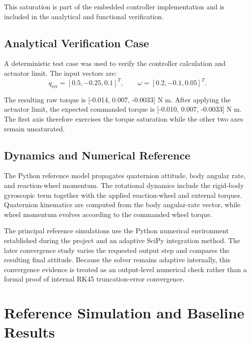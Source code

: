 \documentclass[11pt,a4paper]{article}
\begin{document}
This saturation is part of the embedded controller implementation and is included in the analytical and functional verification.


\subsection{Analytical Verification Case}

A deterministic test case was used to verify the controller calculation and actuator limit. The input vectors are:
\begin{equation}
q_{\mathrm{err}}=[0.5,-0.25,0.1]^T,\qquad \omega=[0.2,-0.1,0.05]^T.
\end{equation}

The resulting raw torque is [-0.014, 0.007, -0.0033] N m. After applying the actuator limit, the expected commanded torque is [-0.010, 0.007, -0.0033] N m. The first axis therefore exercises the torque saturation while the other two axes remain unsaturated.


\subsection{Dynamics and Numerical Reference}

The Python reference model propagates quaternion attitude, body angular rate, and reaction-wheel momentum. The rotational dynamics include the rigid-body gyroscopic term together with the applied reaction-wheel and external torques. Quaternion kinematics are computed from the body angular-rate vector, while wheel momentum evolves according to the commanded wheel torque.

The principal reference simulations use the Python numerical environment established during the project and an adaptive SciPy integration method. The later convergence study varies the requested output step and compares the resulting final attitude. Because the solver remains adaptive internally, this convergence evidence is treated as an output-level numerical check rather than a formal proof of internal RK45 truncation-error convergence.


\section{Reference Simulation and Baseline Results}
\end{document}
